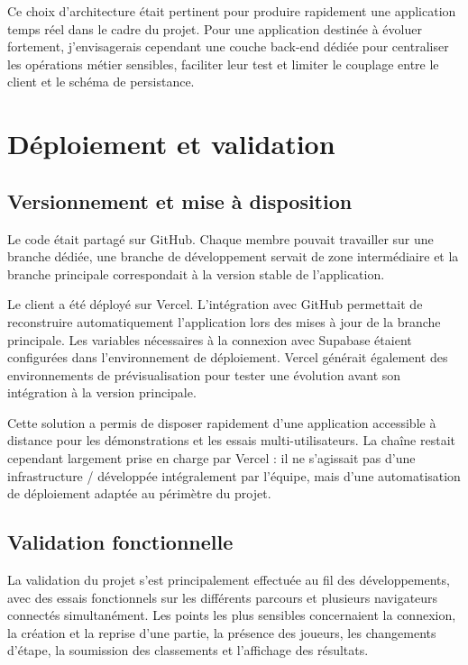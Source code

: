 Ce choix d'architecture était pertinent pour produire rapidement une application temps réel dans le cadre du projet. Pour une application destinée à évoluer fortement, j'envisagerais cependant une couche back-end dédiée pour centraliser les opérations métier sensibles, faciliter leur test et limiter le couplage entre le client et le schéma de persistance.

\section{Déploiement et validation}

\subsection{Versionnement et mise à disposition}

Le code était partagé sur GitHub. Chaque membre pouvait travailler sur une branche dédiée, une branche de développement servait de zone intermédiaire et la branche principale correspondait à la version stable de l'application.

Le client a été déployé sur Vercel. L'intégration avec GitHub permettait de reconstruire automatiquement l'application lors des mises à jour de la branche principale. Les variables nécessaires à la connexion avec Supabase étaient configurées dans l'environnement de déploiement. Vercel générait également des environnements de prévisualisation pour tester une évolution avant son intégration à la version principale.

Cette solution a permis de disposer rapidement d'une application accessible à distance pour les démonstrations et les essais multi-utilisateurs. La chaîne restait cependant largement prise en charge par Vercel : il ne s'agissait pas d'une infrastructure / développée intégralement par l'équipe, mais d'une automatisation de déploiement adaptée au périmètre du projet.

\subsection{Validation fonctionnelle}

La validation du projet s'est principalement effectuée au fil des développements, avec des essais fonctionnels sur les différents parcours et plusieurs navigateurs connectés simultanément. Les points les plus sensibles concernaient la connexion, la création et la reprise d'une partie, la présence des joueurs, les changements d'étape, la soumission des classements et l'affichage des résultats.

